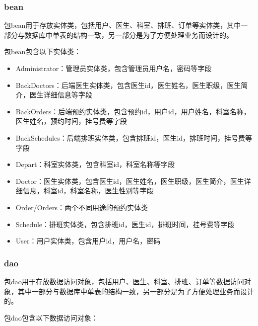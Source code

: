 \documentclass[UTF8,12pt]{article}
\begin{document}
\subsubsection{bean}
包bean用于存放实体类，包括用户、医生、科室、排班、订单等实体类，其中一部分与数据库中单表的结构一致，另一部分是为了方便处理业务而设计的。

包bean包含以下实体类：

\begin{itemize}
    \item Administrator：管理员实体类，包含管理员用户名，密码等字段
    \item BackDoctors：后端医生实体类，包含医生id，医生姓名，医生职级，医生简介，医生详细信息等字段
    \item BackOrders：后端预约实体类，包含预约id，用户id，用户姓名，科室名称，医生姓名，预约时间，挂号费等字段
    \item BackSchedules：后端排班实体类，包含排班id，医生id，排班时间，挂号费等字段
    \item Depart：科室实体类，包含科室id，科室名称等字段
    \item Doctor：医生实体类，包含医生id，医生姓名，医生职级，医生简介，医生详细信息，科室id，科室名称，医生性别等字段
    \item Order/Orders：两个不同用途的预约实体类
    \item Schedule：排班实体类，包含排班id，医生id，排班时间，挂号费等字段
    \item User：用户实体类，包含用户id，用户名，密码
\end{itemize}

\subsubsection{dao}
包dao用于存放数据访问对象，包括用户、医生、科室、排班、订单等数据访问对象，其中一部分与数据库中单表的结构一致，另一部分是为了方便处理业务而设计的。

包dao包含以下数据访问对象：
\end{document}
